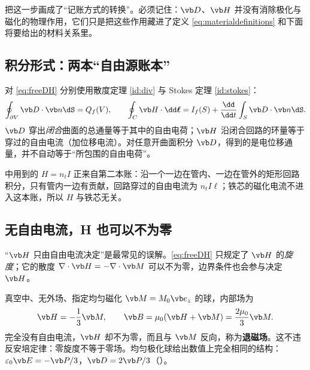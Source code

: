 
 把这一步画成了“记账方式的转换”。必须记住：$\vb D$、$\vb H$ 并没有消除极化与磁化的物理作用，它们只是把这些作用藏进了定义 \eqref{eq:materialdefinitions} 和下面将要给出的材料关系里。

\subsection{积分形式：两本“自由源账本”}
对 \eqref{eq:freeDH} 分别使用散度定理 \eqref{id:div} 与 Stokes 定理 \eqref{id:stokes}：
\begin{equation}
\oint_{\partial V}\vb D\cdot\vb n\dS=Q_f(V),\qquad
\oint_C\vb H\cdot\dd\boldsymbol\ell=I_f(S)+\frac{\dd}{\dd t}\int_S\vb D\cdot\vb n\dS.
\label{eq:DHintegral}
\end{equation}
$\vb D$ 穿出\emph{闭合}曲面的总通量等于其中的自由电荷；$\vb H$ 沿闭合回路的环量等于穿过的自由电流（加位移电流）。对任意开曲面积分 $\vb D$，得到的是电位移通量，并不自动等于“所包围的自由电荷”。

 中用到的 $H=n_tI$ 正来自第二本账：沿一个一边在管内、一边在管外的矩形回路积分，只有管内一边有贡献，回路穿过的自由电流为 $n_tI\ell$；铁芯的磁化电流不进入这本账，所以 $H$ 与铁芯无关。

\subsection{无自由电流，H 也可以不为零}
“$\vb H$ 只由自由电流决定”是最常见的误解。\eqref{eq:freeDH} 只规定了 $\vb H$ 的\emph{旋度}；它的散度 $\nabla\cdot\vb H=-\nabla\cdot\vb M$ 可以不为零，边界条件也会参与决定 $\vb H$。


真空中、无外场、指定均匀磁化 $\vb M=M_0\vb e_z$ 的球，内部场为~\cite{demagnetizing}
\begin{equation}
\vb H=-\frac13\vb M,\qquad \vb B=\mu_0(\vb H+\vb M)=\frac{2\mu_0}{3}\vb M .
\label{eq:atlassphere}
\end{equation}
完全没有自由电流，$\vb H$ 却不为零，而且与 $\vb M$ 反向，称为\textbf{退磁场}。这不违反安培定律：零旋度不等于零场。均匀极化球给出数值上完全相同的结构：$\varepsilon_0\vb E=-\vb P/3$，$\vb D=2\vb P/3$（）。

